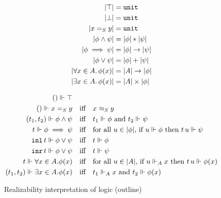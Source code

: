 \begin{figure*}
  \centering
  \parbox[t]{0.35\textwidth}{
    \begin{align*}
      |\top| &= \mathtt{unit} \\
      |\bot| &= \mathtt{unit} \\
      |x =_S y| &= \mathtt{unit} \\
      |\phi \land \psi| &= |\phi| * |\psi| \\
      |\phi \implies \psi| &= |\phi| \to |\psi| \\
      |\phi \lor \psi| &= |\phi| + |\psi| \\
      |\forall x \in A .\, \phi(x)| &= |A| \to |\phi| \\
      |\exists x \in A .\, \phi(x)| &= |A| \times |\phi|
    \end{align*}
  }
  \vline
  \quad
  \parbox[t]{0.5\textwidth}{
    \begin{align*}
      () \Vdash \top &
      \\
      () \Vdash x =_S y
        &\quad\text{iff}\quad 
      x \approx_{S} y
      \\
      (t_1,t_2) \Vdash \phi \land \psi
        &\quad\text{iff}\quad
        \text{$t_1 \Vdash \phi$ and $t_2 \Vdash \psi$}
      \\
      t \Vdash \phi \implies \psi
        &\quad\text{iff}\quad
        \text{for all $u \in |\phi|$, if $u \Vdash \phi$ then $t\,u
          \Vdash \psi$}
      \\
      \texttt{inl}\,t \Vdash \phi \lor \psi
        &\quad\text{iff}\quad
        \text{$t \Vdash \phi$}
      \\
      \texttt{inr}\,t \Vdash \phi \lor \psi
        &\quad\text{iff}\quad
        \text{$t \Vdash \psi$}
      \\
      t \Vdash \forall x \in A . \phi(x)
        &\quad\text{iff}\quad
        \text{for all $u \in |A|$, if $u \Vdash_A x$ then $t\,u \Vdash \phi(x)$}
      \\
      (t_1, t_2) \Vdash \exists x \in A . \phi(x)
        &\quad\text{iff}\quad
        \text{$t_1 \Vdash_A x$ and $t_2 \Vdash \phi(x)$}
    \end{align*}
  }
  \caption{Realizability interpretation of logic (outline)}
  \label{fig:rz-logic}
\end{figure*}

